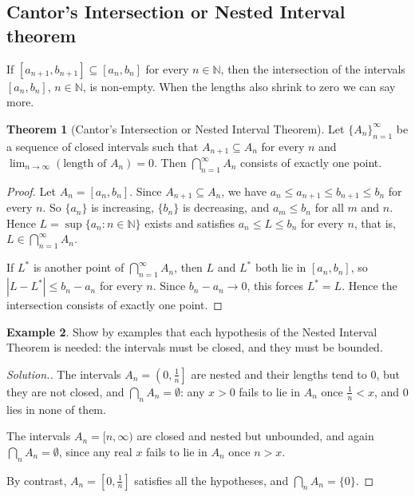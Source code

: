 \documentclass[11pt,a4paper]{article}
\numberwithin{equation}{section}
\theoremstyle{definition}
\newtheorem{thm}{Theorem}[subsection]
\newtheorem{exa}[thm]{Example}
\newenvironment{solution}
  {\renewcommand{\qedsymbol}{}\begin{proof}[\textit{Solution}.]}
  {\end{proof}}
\begin{document}
\subsection{Cantor's Intersection or Nested Interval theorem}

If $[a_{n + 1}, b_{n + 1}]\subseteq [a_n, b_n]$ for every $n \in \mathbb{N}$, then the intersection of the intervals $[a_n, b_n]$, $n\in \mathbb{N}$, is non-empty. When the lengths also shrink to zero we can say more.


\begin{thm}[Cantor's Intersection or Nested Interval Theorem]
Let $\{A_n \}^{\infty}_{n = 1}$ be a sequence of closed intervals such that $A_{n + 1} \subseteq A_n$ for every $n$ and $\lim_{n\rightarrow \infty}(\text{length of } A_n) = 0$. Then $\bigcap^{\infty}_{n=1} A_n$ consists of exactly one point.
\end{thm}

\begin{proof}
Let $A_n = [a_n, b_n]$. Since $A_{n + 1} \subseteq A_n$, we have $a_n \leq a_{n + 1} \leq b_{n + 1} \leq b_n$ for every $n$. So $\{a_n\}$ is increasing, $\{b_n\}$ is decreasing, and $a_m \leq b_n$ for all $m$ and $n$. Hence $L = \sup \{ a_n : n \in \mathbb{N}\}$ exists and satisfies $a_n\leq L \leq b_n$ for every $n$, that is, $L \in \bigcap^{\infty}_{n = 1} A_n$.

If $L^*$ is another point of $\bigcap^{\infty}_{n = 1} A_n$, then $L$ and $L^*$ both lie in $[a_n,b_n]$, so $|L - L^*| \leq b_n - a_n$ for every $n$. Since $b_n - a_n \longrightarrow 0$, this forces $L^* = L$. Hence the intersection consists of exactly one point.
\end{proof}

\begin{exa}
Show by examples that each hypothesis of the Nested Interval Theorem is needed: the intervals must be closed, and they must be bounded.
\end{exa}

\begin{solution}
The intervals $A_n = \left(0,\frac{1}{n}\right]$ are nested and their lengths tend to $0$, but they are not closed, and $\bigcap_n A_n = \emptyset$: any $x>0$ fails to lie in $A_n$ once $\frac{1}{n}<x$, and $0$ lies in none of them.

The intervals $A_n = [n,\infty)$ are closed and nested but unbounded, and again $\bigcap_n A_n = \emptyset$, since any real $x$ fails to lie in $A_n$ once $n>x$.

By contrast, $A_n = \left[0,\frac{1}{n}\right]$ satisfies all the hypotheses, and $\bigcap_n A_n = \{0\}$.
\end{solution}
\end{document}
